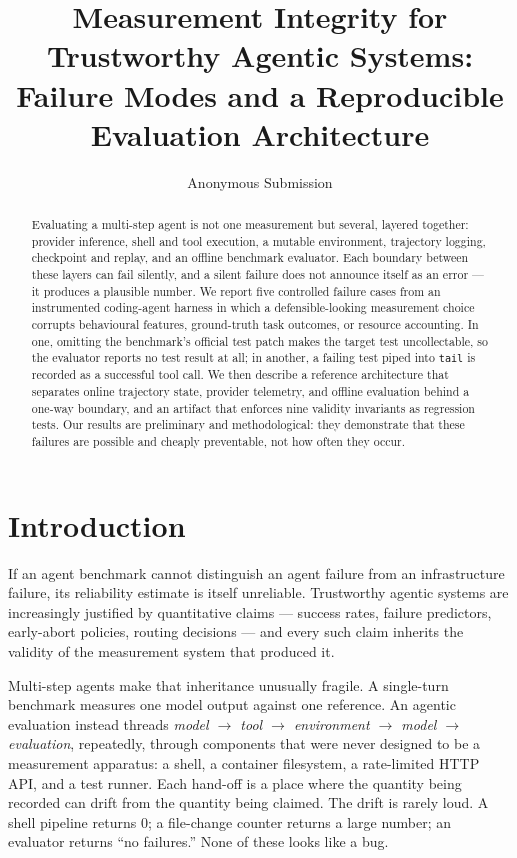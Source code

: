 \documentclass[letterpaper]{article}
\title{Measurement Integrity for Trustworthy Agentic Systems:\\
Failure Modes and a Reproducible Evaluation Architecture}
\author{Anonymous Submission}
\begin{document}
\maketitle

\begin{abstract}
Evaluating a multi-step agent is not one measurement but several, layered
together: provider inference, shell and tool execution, a mutable environment,
trajectory logging, checkpoint and replay, and an offline benchmark evaluator.
Each boundary between these layers can fail silently, and a silent failure does
not announce itself as an error --- it produces a plausible number. We report
five controlled failure cases from an instrumented coding-agent harness in which
a defensible-looking measurement choice corrupts behavioural features,
ground-truth task outcomes, or resource accounting. In one, omitting the
benchmark's official test patch makes the target test uncollectable, so the
evaluator reports no test result at all; in another, a failing test piped into
\texttt{tail} is recorded as a successful tool call. We then describe a
reference architecture that separates online trajectory state, provider
telemetry, and offline evaluation behind a one-way boundary, and an artifact
that enforces nine validity invariants as regression tests. Our results are
preliminary and methodological: they demonstrate that these failures are
possible and cheaply preventable, not how often they occur.
\end{abstract}

\section{Introduction}

If an agent benchmark cannot distinguish an agent failure from an infrastructure
failure, its reliability estimate is itself unreliable. Trustworthy agentic
systems are increasingly justified by quantitative claims --- success rates,
failure predictors, early-abort policies, routing decisions --- and every such
claim inherits the validity of the measurement system that produced it.

Multi-step agents make that inheritance unusually fragile. A single-turn
benchmark measures one model output against one reference. An agentic
evaluation instead threads
\emph{model $\rightarrow$ tool $\rightarrow$ environment $\rightarrow$ model
$\rightarrow$ evaluation},
repeatedly, through components that were never designed to be a measurement
apparatus: a shell, a container filesystem, a rate-limited HTTP API, and a test
runner. Each hand-off is a place where the quantity being recorded can drift
from the quantity being claimed. The drift is rarely loud. A shell pipeline
returns $0$; a file-change counter returns a large number; an evaluator returns
``no failures.'' None of these looks like a bug.
\end{document}
